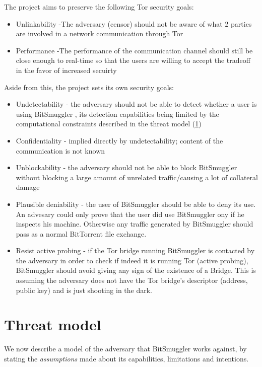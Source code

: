 \documentclass[11pt]{book} %
\newcommand{\projectName}{BitSmuggler }
\begin{document}
The project aims to preserve the following Tor security goals:

\begin{itemize}
\item Unlinkability -The adversary (censor) should not be aware of what 2 parties are involved in a network communication through Tor
\item Performance -The performance of the communication channel should still be close enough to real-time so that the users are willing  to accept the tradeoff  in the favor of increased secuirty
\end{itemize}

Aside from this, the project sets its own security goals: 
\begin{itemize}
\item Undetectability - the adversary should not be able to detect whether a user is using \projectName, its detection capabilities being limited by the computational constraints described in the threat model (\ref{sec:threatModel})
\item Confidentiality - implied directly by undetectability; content of the communication is not known
\item Unblockability - the adversary should not be able to block \projectName without blocking a large amount of unrelated traffic/causing a lot of collateral damage
\item Plausible deniability - the user of \projectName should be able to deny its use. An advesary could only prove that the user did use \projectName ony if he inspects his machine. Otherwise any traffic generated by \projectName should pass as a normal BitTorrent file exchange.
\item Resist active probing - if the Tor bridge running \projectName is contacted by the adversary in order to check if indeed it is running Tor (active probing), \projectName should avoid giving any sign of the existence of a Bridge. This is assuming the adversary does not have the Tor bridge's descriptor (address, public key) and is just shooting in the dark.
\end{itemize}


\chapter{Threat model}
\label{sec:threatModel}

We now describe a model of the adversary that \projectName works against, by stating the \textit{assumptions} made about its capabilities, limitations and intentions.
\end{document}
